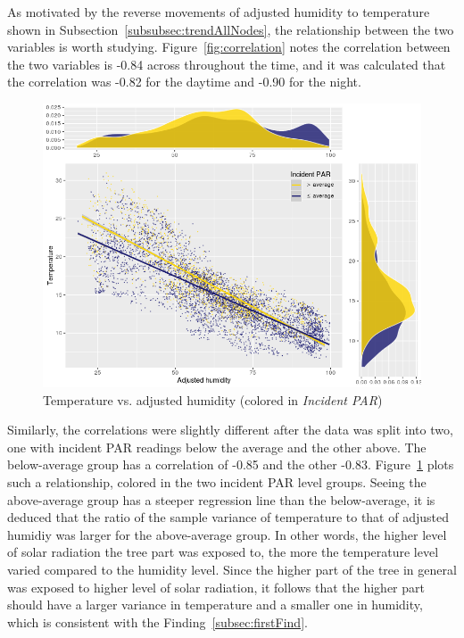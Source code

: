 \documentclass[11pt]{article}
\begin{document}
As motivated by the reverse movements of adjusted humidity to temperature shown in Subsection~\ref{subsubsec:trendAllNodes}, the relationship between the two variables is worth studying. Figure~\ref{fig:correlation} notes the correlation between the two variables is -0.84 across throughout the time, and it was calculated that the correlation was -0.82 for the daytime and -0.90 for the night. 
\begin{figure}[!h]
  \centering
    \includegraphics[width=.8\textwidth]{../figures/tmp.png}
  \caption{Temperature vs. adjusted humidity (colored in \textit{Incident PAR})}
  \label{fig:tempHumidPar}
\end{figure}
Similarly, the correlations were slightly different after the data was split into two, one with incident PAR readings below the average and the other above. The below-average group has a correlation of -0.85 and the other -0.83. Figure~\ref{fig:tempHumidPar} plots such a relationship, colored in the two incident PAR level groups. Seeing the above-average group has a steeper regression line than the below-average, it is deduced that the ratio of the sample variance of temperature to that of adjusted humidiy was larger for the above-average group. In other words, the higher level of solar radiation the tree part was exposed to, the more the temperature level varied compared to the humidity level. Since the higher part of the tree in general was exposed to higher level of solar radiation, it follows that the higher part should have a larger variance in temperature and a smaller one in humidity, which is consistent with the Finding~\ref{subsec:firstFind}.\\
\end{document}
